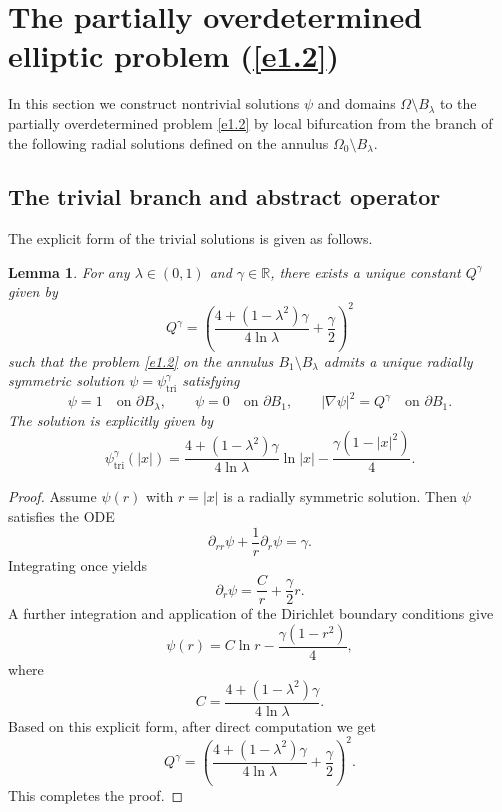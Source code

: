 \documentclass[reqno]{amsart}
\numberwithin{equation}{section}
\newtheorem{lemma}[theorem]{Lemma}
\numberwithin{equation}{section}
\numberwithin{equation}{section}
\begin{document}
\medskip
\section{The partially overdetermined elliptic problem (\ref{e1.2})}

In this section we construct nontrivial solutions \(\psi\) and domains \(\Omega \setminus B_\lambda\) to the partially overdetermined problem \eqref{e1.2} by local bifurcation from the branch of the following radial solutions defined on the annulus \(\Omega_0 \setminus B_\lambda\).


\subsection{The trivial branch and abstract operator}\label{sub3.1}

The explicit form of the trivial solutions is given as follows.

\begin{lemma}\label{lem3.1}
For any \(\lambda \in (0,1)\) and \(\gamma \in \mathbb{R}\), there exists a unique constant \(Q^\gamma\) given by
\[
Q^\gamma = \left( \frac{4 + (1 - \lambda^2)\gamma}{4\ln\lambda} + \frac{\gamma}{2} \right)^2
\]
such that the problem \eqref{e1.2} on the annulus \(B_1 \setminus B_\lambda\) admits a unique radially symmetric solution \(\psi = \psi^\gamma_\mathrm{tri}\) satisfying
\[
\psi = 1 \quad \text{on } \partial B_\lambda, \qquad
\psi = 0 \quad \text{on } \partial B_1, \qquad
|\nabla \psi|^2 = Q^\gamma \quad \text{on } \partial B_1.
\]
The solution is explicitly given by
\[
\psi^\gamma_\mathrm{tri}(|x|) = \frac{4 + (1 - \lambda^2)\gamma}{4\ln\lambda} \ln |x| - \frac{\gamma(1 - |x|^2)}{4}.
\]
\end{lemma}

\begin{proof}
Assume \(\psi(r)\) with \(r = |x|\) is a radially symmetric solution. Then \(\psi\) satisfies the ODE
\[
\partial_{rr}\psi + \frac{1}{r}\partial_{r}\psi = \gamma.
\]
Integrating once yields
\[
\partial_{r}\psi= \frac{C}{r} + \frac{\gamma}{2} r.
\]
A further integration and application of the Dirichlet boundary conditions give
\[
\psi(r) = C \ln r - \frac{\gamma(1 - r^2)}{4},
\]
where
\[
C = \frac{4 + (1 - \lambda^2)\gamma}{4\ln\lambda}.
\]
Based on this explicit form, after direct computation we get
\[
Q^\gamma = \left( \frac{4 + (1 - \lambda^2)\gamma}{4\ln\lambda} + \frac{\gamma}{2} \right)^2.
\]
This completes the proof.
\end{proof}
\end{document}
